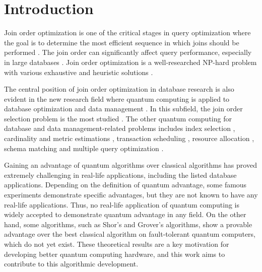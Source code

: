 \section{Introduction}

Join order optimization is one of the critical stages in query optimization where the goal is to determine the most efficient sequence in which joins should be performed \cite{10.1145/582095.582099}. The join order can significantly affect query performance, especially in large databases \cite{Neumann_Radke_2018}. Join order optimization is a well-researched NP-hard problem \cite{10.1145/1270.1498} with various exhaustive and heuristic solutions \cite{10.14778/2850583.2850594, 10.1007/s007780050040}.

The central position of join order optimization in database research is also evident in the new research field where quantum computing is applied to database optimization and data management \cite{Schonberger_2022, Uotila_2022}. In this subfield, the join order selection problem is the most studied \cite{Schonberger_Scherzinger_Mauerer, Winker_Calikyilmaz_Gruenwald_Groppe_2023, Schonberger_Trummer_Mauerer_2023, Nayak_Winker_Groppe_Groppe_2024, Franz_Winker_Groppe_Mauerer_2024,10.14778/3632093.3632112, DBLP:conf/q-data/SaxenaSS24}. The other quantum computing for database and data management-related problems includes index selection \cite{Gruenwald_Winker_Groppe_Groppe_2023, DBLP:conf/q-data/TrummerV24}, cardinality and metric estimations \cite{Uotila_2023_sqlcircuits,DBLP:conf/q-data/KittelmannSS24}, transaction scheduling \cite{Bittner_Groppe_2020b}, resource allocation \cite{Uotila_Lu_2023}, schema matching \cite{Fritsch_Scherzinger_2023} and multiple query optimization \cite{Trummer_Koch_2016}.

Gaining an advantage of quantum algorithms over classical algorithms has proved extremely challenging in real-life applications, including the listed database applications. Depending on the definition of quantum advantage, some famous experiments \cite{Arute_Arya_Babbush_Bacon_Bardin_Barends_Biswas_Boixo_Brandao_Buell_etal2019,Harrow_Montanaro_2017,Kim_Eddins_Anand_Wei_vandenBerg_Rosenblatt_Nayfeh_Wu_Zaletel_Temme_etal_2023,King_Nocera_Rams_Dziarmaga_Wiersema_Bernoudy_Raymond_Kaushal_Heinsdorf_Harris_etal_2024,Madsen_Laudenbach_Askarani_Rortais_Vincent_Bulmer_Miatto_Neuhaus_Helt_Collins_etal_2022,Zhong_Wang_Deng_Chen_Peng_Luo_Qin_Wu_Ding_Hu_etal_2020, Zhu_Cao_Chen_Chen_Chen_Chung_Deng_Du_Fan_Gong_etal_2021} demonstrate specific advantages, but they are not known to have any real-life applications. Thus, no real-life application of quantum computing is widely accepted to demonstrate quantum advantage in any field. On the other hand, some algorithms, such as Shor's and Grover's algorithms, show a provable advantage over the best classical algorithm on fault-tolerant quantum computers, which do not yet exist. These theoretical results are a key motivation for developing better quantum computing hardware, and this work aims to contribute to this algorithmic development.

